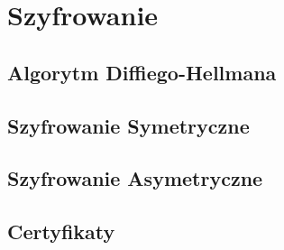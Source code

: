 \section{Szyfrowanie}

\subsection{Algorytm Diffiego-Hellmana}

\subsection{Szyfrowanie Symetryczne}

\subsection{Szyfrowanie Asymetryczne}

\subsection{Certyfikaty}